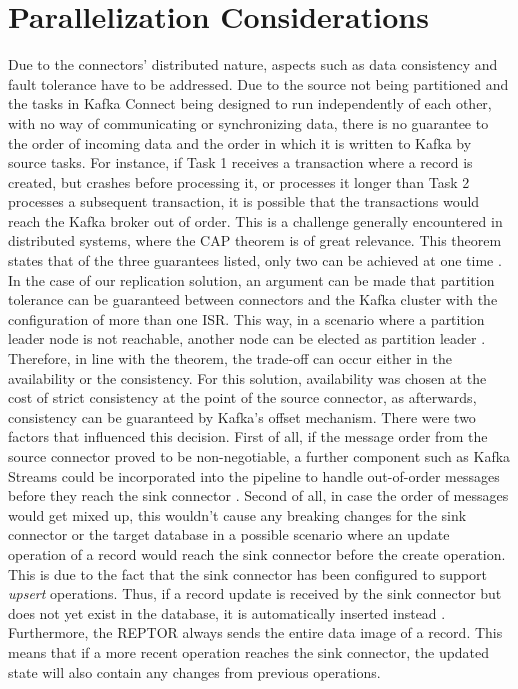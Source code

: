 \section{Parallelization Considerations}
\label{ch04:pipelinedevelopment:parallelizationconsiderations}
Due to the connectors' distributed nature, aspects such as data consistency and fault tolerance have to be addressed. Due to the source not being partitioned and the tasks in Kafka Connect being designed to run independently of each other, with no way of communicating or synchronizing data, there is no guarantee to the order of incoming data and the order in which it is written to Kafka by source tasks. For instance, if Task 1 receives a transaction where a record is created, but crashes before processing it, or processes it longer than Task 2 processes a subsequent transaction, it is possible that the transactions would reach the Kafka broker out of order. This is a challenge generally encountered in distributed systems, where the \ac{CAP} theorem is of great relevance. This theorem states that of the three guarantees listed, only two can be achieved at one time \cite{nookala2022distributedshift}. In the case of our replication solution, an argument can be made that partition tolerance can be guaranteed between connectors and the Kafka cluster with the configuration of more than one \ac{ISR}. This way, in a scenario where a partition leader node is not reachable, another node can be elected as partition leader \cite{optimizingkafkacap}. Therefore, in line with the theorem, the trade-off can occur either in the availability or the consistency. For this solution, availability was chosen at the cost of strict consistency at the point of the source connector, as afterwards, consistency can be guaranteed by Kafka's offset mechanism. There were two factors that influenced this decision. First of all, if the message order from the source connector proved to be non-negotiable, a further component such as Kafka Streams could be incorporated into the pipeline to handle out-of-order messages before they reach the sink connector \cite{wang2021consistency}. Second of all, in case the order of messages would get mixed up, this wouldn't cause any breaking changes for the sink connector or the target database in a possible scenario where an update operation of a record would reach the sink connector before the create operation. This is due to the fact that the sink connector has been configured to support \textit{upsert} operations. Thus, if a record update is received by the sink connector but does not yet exist in the database, it is automatically inserted instead \cite{jdbcsinkdocumentation}. Furthermore, the \ac{REPTOR} always sends the entire data image of a record. This means that if a more recent operation reaches the sink connector, the updated state will also contain any changes from previous operations.

